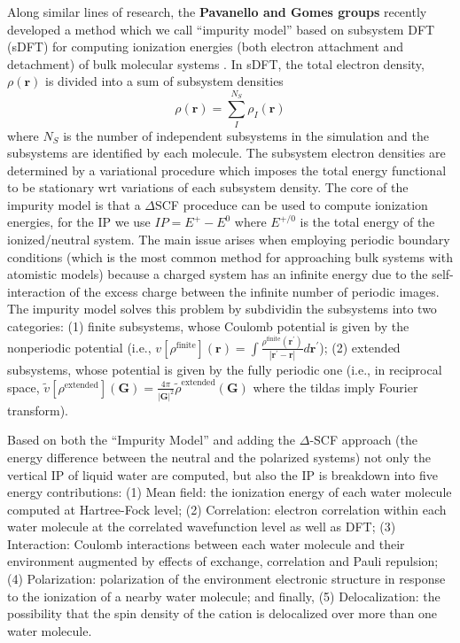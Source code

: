\documentclass[notitlepage,12pt]{report}
\def\br{{\mathbf{r}}}
\def\bG{{\mathbf{G}}}
\def\brp{{\mathbf{r}^\prime}}
\begin{document}
    Along similar lines of research, the {\bf Pavanello and Gomes groups} recently developed a method which we call ``impurity model'' based on subsystem DFT (sDFT) \supercite{jacob2014subsystem,wesolowski2015frozen,krishtal2015subsystem} for computing ionization energies (both electron attachment and detachment) of bulk molecular systems \supercite{tolle2019charged}. In sDFT,  the total electron density, $\rho(\br)$ is divided into a sum of subsystem densities 
\begin{equation}
    \label{dens}
    \rho(\br) = \sum_I^{N_S}\rho_I(\br)
\end{equation}
where $N_S$ is the number of independent subsystems in the simulation and the subsystems are identified by each molecule. The subsystem electron densities are determined by a variational procedure which imposes the total energy functional to be stationary wrt variations of each subsystem density. The core of the impurity model is that a $\Delta$SCF proceduce can be used to compute ionization energies, for the IP we use $IP=E^+-E^0$ where $E^{+/0}$ is the total energy of the ionized/neutral system. The main issue arises when employing periodic boundary conditions (which is the most common method for approaching bulk systems with atomistic models) because a charged system has an infinite energy due to the self-interaction of the excess charge between the infinite number of periodic images. The impurity model solves this problem by subdividin the subsystems into two categories: (1) finite subsystems, whose Coulomb potential is given by the nonperiodic potential (i.e., $v[\rho^{\text{finite}}](\br)=\int\frac{\rho^{\text{finite}}(\brp)}{|\brp-\br|}d\brp$); (2) extended subsystems, whose potential is given by the fully periodic one (i.e., in reciprocal space, $\tilde v[\rho^{\text{extended}}](\bG)=\frac{4\pi}{|\bG|^2}\tilde\rho^\text{extended}(\bG)$ where the tildas imply Fourier transform).

	Based on both the ``Impurity Model'' and adding the $\Delta$-SCF approach\supercite{bagus1965self,waskom2017mwaskom} (the energy difference between the neutral and the polarized systems) not only the vertical IP of liquid water are computed, but also the IP is breakdown into five energy contributions:  (1) Mean field: the ionization energy of each water molecule computed at Hartree-Fock level; (2) Correlation: electron correlation within each water molecule at the correlated wavefunction level as well as DFT; (3) Interaction: Coulomb interactions between each water molecule and their environment augmented by effects of exchange, correlation and Pauli repulsion; (4) Polarization: polarization of the environment electronic structure in response to the ionization of a nearby water molecule; and finally, (5) Delocalization: the possibility that the spin density of the cation is delocalized over more than one water molecule.
	
\end{document}

